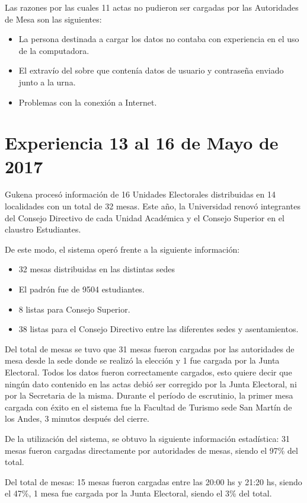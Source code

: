 Las razones por las cuales 11 actas no pudieron ser cargadas por las Autoridades de Mesa son las siguientes:
\begin{itemize}
\item La persona destinada a cargar los datos no contaba con experiencia en el uso de la computadora.
\item El extravío del sobre que contenía datos de usuario y contraseña enviado junto a la urna.
\item Problemas con la conexión a Internet.
\end{itemize}

\section{Experiencia 13 al 16 de Mayo de 2017}
Gukena procesó información de 16 Unidades Electorales distribuidas en 14 localidades con un total de 32 mesas. Este año, la Universidad renovó integrantes del Consejo Directivo de cada Unidad Académica y el Consejo Superior en el claustro Estudiantes.

De este modo, el sistema operó frente a la siguiente información:
\begin{itemize}
    \item 32 mesas distribuidas en las distintas sedes
    \item El padrón fue de 9504 estudiantes.
    \item 8 listas para Consejo Superior.
    \item 38 listas para el Consejo Directivo entre las diferentes sedes y asentamientos.
\end{itemize}
  
Del total de mesas se tuvo que 31 mesas fueron cargadas por las autoridades de mesa desde la sede donde se realizó la elección y 1 fue cargada por la Junta Electoral. Todos los datos fueron correctamente cargados, esto quiere decir que ningún dato contenido en las actas debió ser corregido por la Junta Electoral, ni por la Secretaria de la misma.
Durante el período de escrutinio, la primer mesa cargada con éxito en el sistema fue la Facultad de Turismo sede San Martín de los Andes, 3 minutos después del cierre.

De la utilización del sistema, se obtuvo la siguiente información estadística:
31 mesas fueron cargadas directamente por autoridades de mesas, siendo el 97\% del total.

Del total de mesas:
15 mesas fueron cargadas entre las 20:00 hs y 21:20 hs, siendo el 47\%,
1 mesa fue cargada 	por la Junta Electoral, siendo el 3\% del total.

